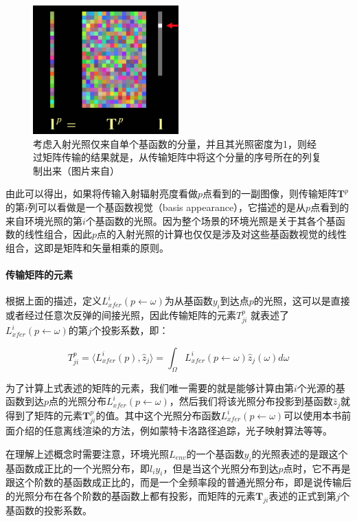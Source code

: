 \begin{figure}
\sidecaption
	\includegraphics[width=0.5\textwidth]{figures/prt/prt-11}
	\caption{考虑入射光照仅来自单个基函数的分量，并且其光照密度为1，则经过矩阵传输的结果就是，从传输矩阵中将这个分量的序号所在的列复制出来（图片来自\cite{a:PrecomputedRadianceTransfer:TheoryandPractice}）}
	\label{f:pl-matrix}
\end{figure}

由此可以得出，如果将传输入射辐射亮度看做$p$点看到的一副图像，则传输矩阵$\mathbf{T}^{p}$的第$i$列可以看做是一个基函数视觉（basis appearance），它描述的是从$p$点看到的来自环境光照的第$i$个基函数的光照。因为整个场景的环境光照是关于其各个基函数的线性组合，因此$p$点的入射光照的计算也仅仅是涉及对这些基函数视觉的线性组合，这即是矩阵和矢量相乘的原则。



\paragraph{传输矩阵的元素}
根据上面的描述，定义$L^{i}_{xfer}(p\leftarrow\omega)$为从基函数$y_i$到达点$p$的光照，这可以是直接或者经过任意次反弹的间接光照，因此传输矩阵的元素$T^{p}_{ji}$ 就表述了$L^{i}_{xfer}(p\leftarrow\omega)$的第$j$个投影系数，即：

\begin{equation}
	T^{p}_{ji}=\langle L^{i}_{xfer}(p),\hat{z}_j\rangle =\int_\Omega L^{i}_{xfer}(p\leftarrow\omega)\hat{z}_j(\omega)d\omega
\end{equation}

为了计算上式表述的矩阵的元素，我们唯一需要的就是能够计算由第$i$个光源的基函数到达$p$点的光照分布$L^{i}_{xfer}(p\leftarrow\omega)$，然后我们将该光照分布投影到基函数$\hat{z}_j$就得到了矩阵的元素$\mathbf{T}^{p}_{ji}$的值。其中这个光照分布函数$L^{i}_{xfer}(p\leftarrow\omega)$可以使用本书前面介绍的任意离线渲染的方法，例如蒙特卡洛路径追踪，光子映射算法等等。

\begin{myshaded}
	在理解上述概念时需要注意，环境光照$L_{env}$的一个基函数$y_i$的光照表述的是跟这个基函数成正比的一个光照分布，即$l_iy_i$，但是当这个光照分布到达$p$点时，它不再是跟这个阶数的基函数成正比的，而是一个全频率段的普通光照分布，即是说传输后的光照分布在各个阶数的基函数上都有投影，而矩阵的元素$\mathbf{T}_{ji}$表述的正式到第$j$个基函数的投影系数。
\end{myshaded}




